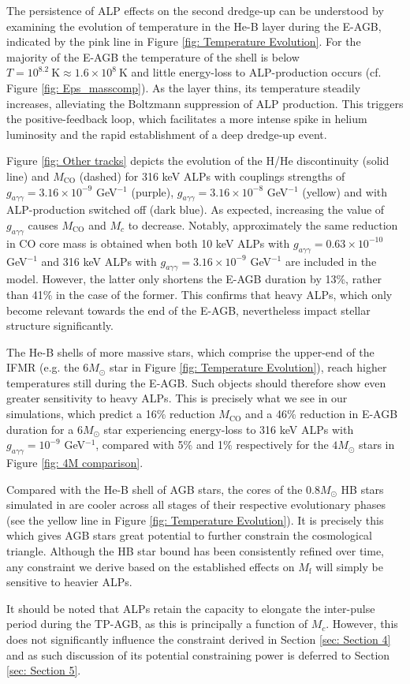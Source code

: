 The persistence of ALP effects on the second dredge-up can be understood by examining the evolution of temperature in the He-B layer during the E-AGB, indicated by the pink line in Figure \ref{fig: Temperature Evolution}. For the majority of the E-AGB the temperature of the shell is below $T=10^{8.2}\ \mathrm{K}\approx 1.6\times10^{8}\ \mathrm{K}$ and little energy-loss to ALP-production occurs (cf. Figure \ref{fig: Eps_masscomp}). As the layer thins, its temperature steadily increases, alleviating the Boltzmann suppression of ALP production. This triggers the positive-feedback loop, which facilitates a more intense spike in helium luminosity and the rapid establishment of a deep dredge-up event.


Figure \ref{fig: Other tracks} depicts the evolution of the H/He discontinuity (solid line) and $M_{\mathrm{CO}}$ (dashed) for 316 keV ALPs with couplings strengths of $g_{a\gamma\gamma}=3.16\times10^{-9}$ GeV$^{-1}$ (purple), $g_{a\gamma\gamma}=3.16\times10^{-8}$ GeV$^{-1}$ (yellow) and with ALP-production switched off (dark blue). As expected, increasing the value of  $g_{a\gamma\gamma}$ causes $M_{\mathrm{CO}}$ and $M_c$ to decrease. Notably, approximately the same reduction in CO core mass is obtained when both 10 keV ALPs with $g_{a\gamma\gamma}=0.63\times10^{-10}$ GeV$^{-1}$ and 316 keV ALPs with $g_{a\gamma\gamma}=3.16\times10^{-9}$ GeV$^{-1}$ are included in the model. However, the latter only shortens the E-AGB duration by 13\%, rather than 41\% in the case of the former. This confirms that heavy ALPs, which only become relevant towards the end of the E-AGB, nevertheless impact stellar structure significantly.


The He-B shells of more massive stars, which comprise the upper-end of the IFMR (e.g. the $6M_{\odot}$ star in Figure \ref{fig: Temperature Evolution}), reach higher temperatures still during the E-AGB. Such objects should therefore show even greater sensitivity to heavy ALPs. This is precisely what we see in our simulations, which predict a 16\% reduction $M_{\mathrm{CO}}$ and a 46\% reduction in E-AGB duration for a $6M_{\odot}$ star experiencing energy-loss to 316 keV ALPs with $g_{a\gamma\gamma}=10^{-9}$ GeV$^{-1}$, compared with 5\% and 1\% respectively for the $4M_{\odot}$ stars in Figure \ref{fig: 4M comparison}.


Compared with the He-B shell of AGB stars, the cores of the $0.8M_{\odot}$ HB stars simulated in \cite{Carenza:2020zil} are cooler across all stages of their respective evolutionary phases (see the yellow line in Figure \ref{fig: Temperature Evolution}). It is precisely this which gives AGB stars great potential to further constrain the cosmological triangle. Although the HB star bound has been consistently refined over time, any constraint we derive based on the established effects on $M_{\mathrm{f}}$ will simply be sensitive to heavier ALPs.


It should be noted that ALPs retain the capacity to elongate the inter-pulse period during the TP-AGB, as this is principally a function of $M_{c}$. However, this does not significantly influence the constraint derived in Section \ref{sec: Section 4} and as such discussion of its potential constraining power is deferred to Section \ref{sec: Section 5}. 

